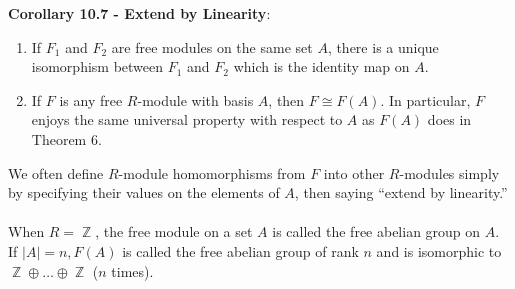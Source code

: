 \documentclass{article}
\DeclareMathOperator{\Z}{\mathbb{Z}}
\begin{document}
\textbf{Corollary 10.7 - Extend by Linearity}: \begin{enumerate}
    \item If $F_1$ and $F_2$ are free modules on the same set $A$, there is a unique isomorphism between $F_1$ and $F_2$ which is the identity map on $A$.
    \item If $F$ is any free $R$-module with basis $A$, then $F \cong F(A)$. In particular, $F$ enjoys the same universal property with respect to $A$ as $F(A)$ does in Theorem 6.
\end{enumerate} We often define $R$-module homomorphisms from $F$ into other $R$-modules simply by specifying their values on the elements of $A$, then saying ``extend by linearity.'' \\ \\
When $R = \Z$, the free module on a set $A$ is called the free abelian group on $A$. If $|A| = n, F(A)$ is called the free abelian group of rank $n$ and is isomorphic to $\Z \oplus \dots \oplus \Z$ ($n$ times).
\end{document}
